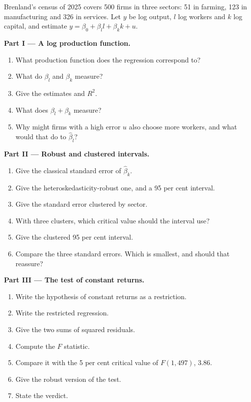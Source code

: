 \begin{problem}
\label{pb:b2:regression-inference:1}
Brenland's census of 2025 covers 500 firms in three sectors: 51 in farming, 123 in manufacturing and 326 in services. Let
$y$ be log output, $l$ log workers and $k$ log capital, and estimate $y = \beta_0 + \beta_ll + \beta_kk + u$.

\medskip
\noindent\textbf{Part I --- A log production function.}
\begin{enumerate}
  \item What production function does the regression correspond to?
  \item What do $\beta_l$ and $\beta_k$ measure?
  \item Give the estimates and $R^2$.
  \item What does $\beta_l + \beta_k$ measure?
  \item Why might firms with a high error $u$ also choose more workers, and what would that do to $\hat\beta_l$?
\end{enumerate}

\medskip
\noindent\textbf{Part II --- Robust and clustered intervals.}
\begin{enumerate}[resume]
  \item Give the classical standard error of $\hat\beta_k$.
  \item Give the heteroskedasticity-robust one, and a 95 per cent interval.
  \item Give the standard error clustered by sector.
  \item With three clusters, which critical value should the interval use?
  \item Give the clustered 95 per cent interval.
  \item Compare the three standard errors. Which is smallest, and should that reassure?
\end{enumerate}

\medskip
\noindent\textbf{Part III --- The test of constant returns.}
\begin{enumerate}[resume]
  \item Write the hypothesis of constant returns as a restriction.
  \item Write the restricted regression.
  \item Give the two sums of squared residuals.
  \item Compute the $F$ statistic.
  \item Compare it with the 5 per cent critical value of $F(1, 497)$, 3.86.
  \item Give the robust version of the test.
  \item State the verdict.
\end{enumerate}


\end{problem}
